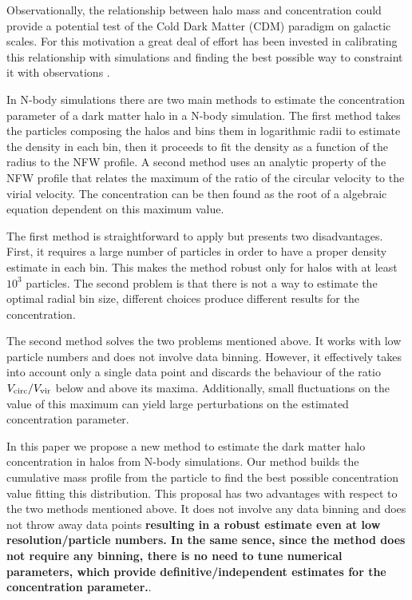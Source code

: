 \documentclass[a4,useAMS,usenatbib,usegraphicx]{mn2e}
\begin{document}
Observationally, the relationship between halo mass and concentration
could provide a potential test of the Cold Dark Matter (CDM) paradigm
on galactic scales.  For this motivation a great deal of effort has
been invested in calibrating this relationship with simulations
\citep{Neto2007,Duffy2008,Munoz2011,Prada2012,Ludlow2014} and finding
the best possible way to constraint it with observations
\citep{Buote2007,Comerford2007,Mandelbaum2008,Giocoli2014,Foex2014,Shan2015}.

In N-body simulations there are two main methods to estimate the
concentration parameter of a dark matter halo in a N-body simulation.
The first method takes the particles composing the halos and bins them
in logarithmic radii to estimate the density in each bin, then it
proceeds to fit the density as a function of the radius to the NFW
profile.  A second method uses an analytic property of the NFW profile
that relates the maximum of the ratio of the circular velocity to the
virial velocity.  The concentration can be then found as the root of a
algebraic equation dependent on this maximum value.

The first method is straightforward to apply but presents two
disadvantages.  First, it requires a large number of particles in
order to have a proper density estimate in each bin.  This makes the
method robust only for halos with at least $10^3$ particles.  The
second problem is that there is not a way to estimate the optimal
radial bin size, different choices produce different results for the
concentration.

The second method solves the two problems mentioned above.  It works
with low particle numbers and does not involve data binning.  However,
it effectively takes into account only a single data point and
discards the behaviour of the ratio $V_{\rm circ}/V_{\rm vir}$ below
and above its maxima.  Additionally, small fluctuations on the value
of this maximum can yield large perturbations on the estimated
concentration parameter.

In this paper we propose a new method to estimate the dark matter halo
concentration in halos from N-body simulations.  Our method builds the
cumulative mass profile from the particle to find the best possible
concentration value fitting this distribution.  This proposal has two
advantages with respect to the two methods mentioned above.  It does
not involve any data binning and does not throw away data points {\bf
  resulting in a robust estimate even at low resolution/particle
  numbers. In the same sence, since the method does not require any
  binning, there is no need to tune numerical parameters, which
  provide definitive/independent estimates for the concentration
  parameter.}.
\end{document}
